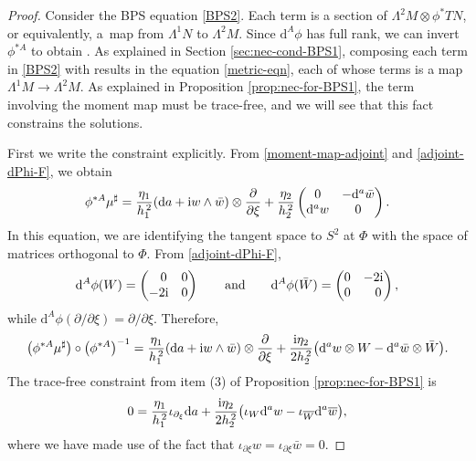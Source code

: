 \documentclass[pdftex]{sigma}
\newcommand{\1}{{\mathbb{1}}}
\def \d{\mathrm{d}}
\newcommand{\ol}{\overline}
\numberwithin{equation}{section}
\begin{document}
\begin{proof}
Consider the BPS equation \eqref{BPS2}. Each term is a section of $\Lambda^2M\otimes\phi^\ast TN$, or equivalently, a~map from $\Lambda^1N$ to $\Lambda^2M$. Since $\d^A\phi$ has full rank, we can invert $\phi^{\ast A}$ to obtain . As explained in Section \ref{sec:nec-cond-BPS1}, composing each term in \eqref{BPS2} with  results in the equation \eqref{metric-eqn}, each of whose terms is a map $\Lambda^1M\to\Lambda^2M$. As explained in Proposition \ref{prop:nec-for-BPS1}, the term involving the moment map must be trace-free, and we will see that this fact constrains the solutions.

First we write the constraint explicitly. From \eqref{moment-map-adjoint} and \eqref{adjoint-dPhi-F}, we obtain
\begin{equation*}
\phi^{\ast A}\mu^\sharp = \frac{\eta_1}{h_1^{\,2}}(\d a+{\rm i}w\wedge\bar{w})\otimes\frac{\partial}{\partial\xi}+\frac{\eta_2}{h_2^{\,2}}\begin{pmatrix}0 & -\d^a\bar{w} \\ \d^a w & 0 \end{pmatrix}.
\end{equation*}
In this equation, we are identifying the tangent space to $S^2$ at $\Phi$ with the space of matrices orthogonal to $\Phi$. From \eqref{adjoint-dPhi-F},
\begin{equation*}
\d^A\phi(W)=\begin{pmatrix}\hphantom{-} 0&0\\-2{\rm i}&0\end{pmatrix} \qquad\text{and}\qquad
\d^A\phi(\bar{W})=\begin{pmatrix}0&-2{\rm i}\\0&\hphantom{-}0\end{pmatrix},
\end{equation*}
while $\d^A\phi(\partial/\partial\xi)=\partial/\partial\xi$. Therefore,
\begin{equation*}
\big(\phi^{\ast A}\mu^\sharp\big)\circ \big(\phi^{\ast A}\big)^{-1} = \frac{\eta_1}{h_1^{\,2}}(\d a+{\rm i}w\wedge\bar{w})\otimes\frac{\partial}{\partial\xi}+\frac{{\rm i}\eta_2}{2h_2^{\,2}}\big(\d^a w\otimes W -\d^a\bar{w}\otimes\bar{W}\big).
\end{equation*}
The trace-free constraint from item (3) of Proposition \ref{prop:nec-for-BPS1} is
\begin{equation}
\label{adjoint-tracefree}
0 = \frac{\eta_1}{h_1^{\,2}}\iota_{\partial_\xi}\d a + \frac{{\rm i}\eta_2}{2h_2^{\,2}}\big(\iota_W\d^a w -\iota_{\ol{W}}\d^a\ol{w}\big),
\end{equation}
where we have made use of the fact that $\iota_{\partial\xi}w=\iota_{\partial\xi}\bar{w}=0$.


\end{proof}
\end{document}
